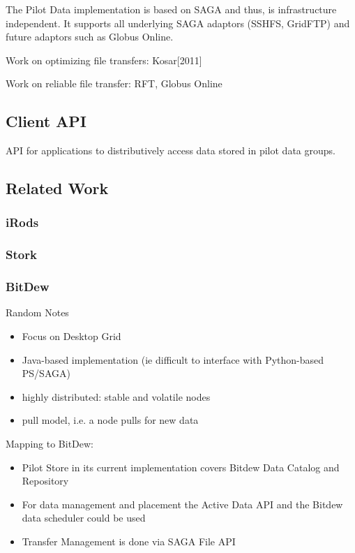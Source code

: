 \documentclass[]{article}
\begin{document}
The Pilot Data implementation is based on SAGA and thus, is infrastructure
independent. It supports all underlying SAGA adaptors (SSHFS, GridFTP) and
future adaptors such as Globus Online.

Work on optimizing file transfers: Kosar[2011]

Work on reliable file transfer: RFT, Globus Online

\subsection{Client API}

API for applications to distributively access data stored in pilot data groups.

\subsection{Related Work}

\subsubsection{iRods}


\subsubsection{Stork}


\subsubsection{BitDew}

Random Notes
\begin{itemize}
	\item Focus on Desktop Grid
	\item Java-based implementation (ie difficult to interface with Python-based PS/SAGA)
	\item highly distributed: stable and volatile nodes
	\item pull model, i.e. a node pulls for new data
\end{itemize}


Mapping to BitDew:
\begin{itemize}
	\item Pilot Store in its current implementation covers Bitdew Data Catalog and Repository
	\item For data management and placement the Active Data API and the Bitdew data scheduler could be used
	\item Transfer Management is done via SAGA File API	
\end{itemize}
\end{document}
